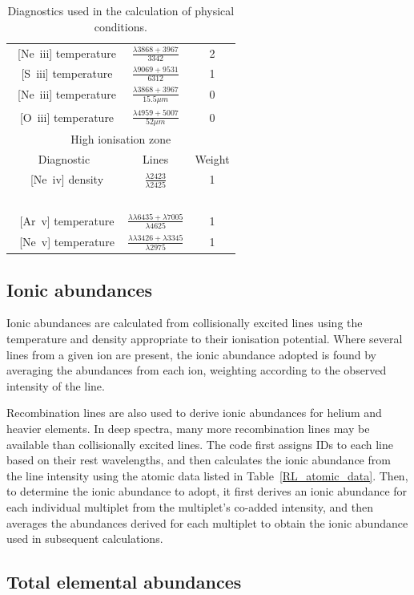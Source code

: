\documentclass[useAMS,usenatbib]{mn2e}
\begin{document}
\begin{table}
\begin{tabular}{ccc}
~[Ne~{\sc iii}] temperature & $\frac{\lambda 3868 + 3967}{3342}$ & 2\\
~[S~{\sc iii}] temperature & $\frac{\lambda 9069 + 9531}{6312}$ & 1\\
~[Ne~{\sc iii}] temperature & $\frac{\lambda 3868 + 3967}{15.5 \mu m}$ & 0\\
~[O~{\sc iii}] temperature & $\frac{\lambda 4959 + 5007}{52 \mu m}$ & 0\\
\hline
\multicolumn{3}{c}{High ionisation zone}\\
\hline
Diagnostic & Lines & Weight \\
~[Ne~{\sc iv}] density & $\frac{\lambda2423}{\lambda2425}$ & 1 \\
~\\
~[Ar~{\sc v}] temperature & $\frac{\lambda \lambda6435 + \lambda7005}{\lambda4625}$ & 1 \\
~[Ne~{\sc v}] temperature & $\frac{\lambda \lambda3426 + \lambda3345}{\lambda2975}$ & 1 \\
\end{tabular}
\label{zonestable}
\caption{Diagnostics used in the calculation of physical conditions.}
\end{table}

\subsection{Ionic abundances}

Ionic abundances are calculated from collisionally excited lines using the temperature and density appropriate to their ionisation potential.  Where several lines from a given ion are present, the ionic abundance adopted is found by averaging the abundances from each ion, weighting according to the observed intensity of the line.

Recombination lines are also used to derive ionic abundances for helium and heavier elements.  In deep spectra, many more recombination lines may be available than collisionally excited lines.  The code first assigns IDs to each line based on their rest wavelengths, and then calculates the ionic abundance from the line intensity using the atomic data listed in Table~\ref{RL_atomic_data}.  Then, to determine the ionic abundance to adopt, it first derives an ionic abundance for each individual multiplet from the multiplet's co-added intensity, and then averages the abundances derived for each multiplet to obtain the ionic abundance used in subsequent calculations.

\subsection{Total elemental abundances}
\end{document}
